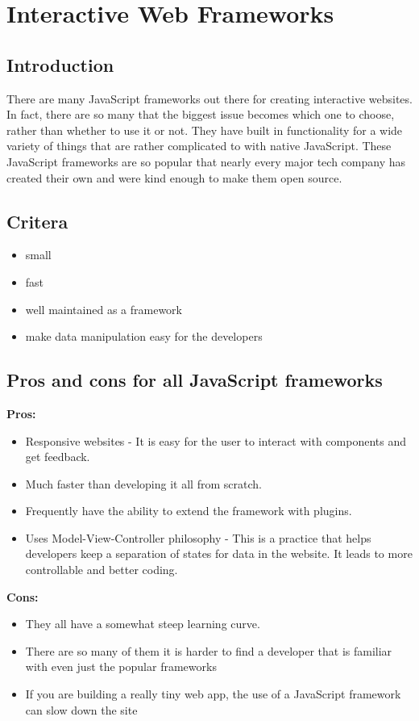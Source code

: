 \documentclass[draftclsnofoot,onecolumn,letterpaper,10pt,compsoc]{IEEEtran}
\begin{document}
\section{Interactive Web Frameworks}
  \subsection{Introduction}
  There are many JavaScript frameworks out there for creating interactive websites.
  In fact, there are so many that the biggest issue becomes which one to choose, rather than whether to use it or not.
  They have built in functionality for a wide variety of things that are rather complicated to with native JavaScript.
  These JavaScript frameworks are so popular that nearly every major tech company has created their own and were kind enough to make them open source.

  \subsection{Critera}
  \begin{itemize}
    \item small
    \item fast
    \item well maintained as a framework
    \item make data manipulation easy for the developers
  \end{itemize}


  \subsection{Pros and cons for all JavaScript frameworks}
  \textbf{Pros:}
  \begin{itemize}
    \item Responsive websites - It is easy for the user to interact with components and get feedback.
    \item Much faster than developing it all from scratch.
    \item Frequently have the ability to extend the framework with plugins.
    \item Uses Model-View-Controller philosophy - This is a practice that helps developers keep a separation of states for data in the website. It leads to more controllable and better coding.
  \end{itemize}

  \noindent \textbf{Cons:}
  \begin{itemize}
    \item They all have a somewhat steep learning curve.
    \item There are so many of them it is harder to find a developer that is familiar with even just the popular frameworks
    \item If you are building a really tiny web app, the use of a JavaScript framework  can slow down the site
  \end{itemize}
\end{document}
